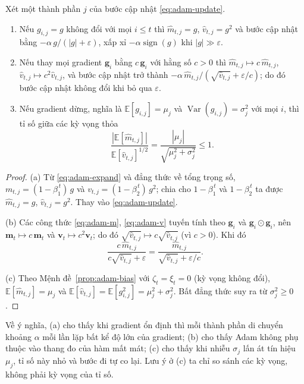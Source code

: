 \begin{proposition}\label{prop:adam-step}
Xét một thành phần $j$ của bước cập nhật \eqref{eq:adam-update}.
\begin{enumerate}
  \item[(a)] Nếu $g_{i,j}=g$ không đổi với mọi $i\le t$ thì $\hat m_{t,j}=g$, $\hat v_{t,j}=g^{2}$ và bước cập nhật bằng $-\alpha\,g/(|g|+\varepsilon)$, xấp xỉ $-\alpha\operatorname{sign}(g)$ khi $|g|\gg\varepsilon$.
  \item[(b)] Nếu thay mọi gradient $\mathbf{g}_i$ bằng $c\,\mathbf{g}_i$ với hằng số $c>0$ thì $\hat m_{t,j}\mapsto c\,\hat m_{t,j}$, $\hat v_{t,j}\mapsto c^{2}\hat v_{t,j}$, và bước cập nhật trở thành $-\alpha\,\hat m_{t,j}/(\sqrt{\hat v_{t,j}}+\varepsilon/c)$; do đó bước cập nhật không đổi khi bỏ qua $\varepsilon$.
  \item[(c)] Nếu gradient dừng, nghĩa là $\mathbb{E}[g_{i,j}]=\mu_j$ và $\operatorname{Var}(g_{i,j})=\sigma_j^{2}$ với mọi $i$, thì tỉ số giữa các kỳ vọng thỏa
  \begin{equation*}
    \frac{|\mathbb{E}[\hat m_{t,j}]|}{\mathbb{E}[\hat v_{t,j}]^{1/2}}=\frac{|\mu_j|}{\sqrt{\mu_j^{2}+\sigma_j^{2}}}\le 1 .
  \end{equation*}
\end{enumerate}
\end{proposition}

\begin{proof}
(a) Từ \eqref{eq:adam-expand} và đẳng thức về tổng trọng số, $m_{t,j}=(1-\beta_1^{\,t})\,g$ và $v_{t,j}=(1-\beta_2^{\,t})\,g^{2}$; chia cho $1-\beta_1^{\,t}$ và $1-\beta_2^{\,t}$ ta được $\hat m_{t,j}=g$, $\hat v_{t,j}=g^{2}$. Thay vào \eqref{eq:adam-update}.

(b) Các công thức \eqref{eq:adam-m}, \eqref{eq:adam-v} tuyến tính theo $\mathbf{g}_i$ và $\mathbf{g}_i\odot\mathbf{g}_i$, nên $\mathbf{m}_t\mapsto c\,\mathbf{m}_t$ và $\mathbf{v}_t\mapsto c^{2}\mathbf{v}_t$; do đó $\sqrt{\hat v_{t,j}}\mapsto c\sqrt{\hat v_{t,j}}$ (vì $c>0$). Khi đó
\[
  \frac{c\,\hat m_{t,j}}{c\sqrt{\hat v_{t,j}}+\varepsilon}=\frac{\hat m_{t,j}}{\sqrt{\hat v_{t,j}}+\varepsilon/c}.
\]

(c) Theo Mệnh đề~\ref{prop:adam-bias} với $\zeta_t=\xi_t=0$ (kỳ vọng không đổi), $\mathbb{E}[\hat m_{t,j}]=\mu_j$ và $\mathbb{E}[\hat v_{t,j}]=\mathbb{E}[g_{i,j}^{2}]=\mu_j^{2}+\sigma_j^{2}$. Bất đẳng thức suy ra từ $\sigma_j^{2}\ge0$.
\end{proof}

Về ý nghĩa, (a) cho thấy khi gradient ổn định thì mỗi thành phần di chuyển khoảng $\alpha$ mỗi lần lặp bất kể độ lớn của gradient; (b) cho thấy Adam không phụ thuộc vào thang đo của hàm mất mát; (c) cho thấy khi nhiễu $\sigma_j$ lấn át tín hiệu $\mu_j$, tỉ số này nhỏ và bước đi tự co lại. Lưu ý ở (c) ta chỉ so sánh các kỳ vọng, không phải kỳ vọng của tỉ số.

